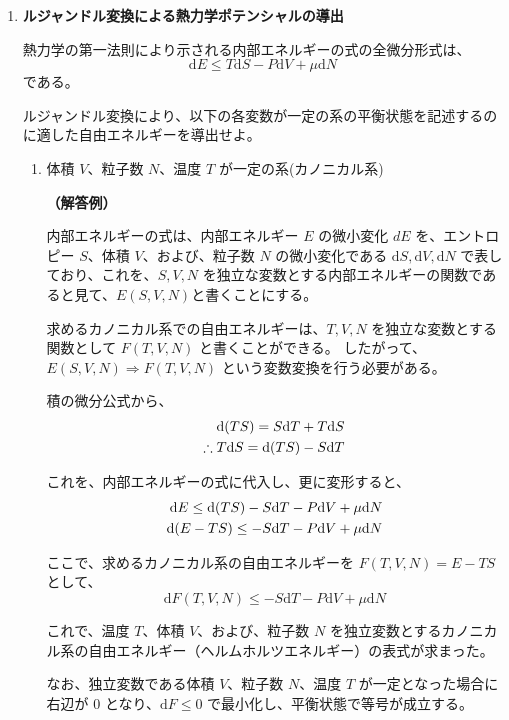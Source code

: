 \documentclass[uplatex,dvipdfmx,a4paper,11pt]{jsarticle}
\newcommand{\diff}{\mathrm d}
\begin{document}
\begin{appendix}
\begin{enumerate}
\begin{enumerate}
\end{enumerate}

\item
{\bf ルジャンドル変換による熱力学ポテンシャルの導出}


熱力学の第一法則により示される内部エネルギーの式の全微分形式は、
\begin{equation*}
\diff E \leq T \diff S - P \diff V + \mu \diff N
\end{equation*}
である。

ルジャンドル変換により、以下の各変数が一定の系の平衡状態を記述するのに適した自由エネルギーを導出せよ。

\begin{enumerate}
\item
体積 $V$、粒子数 $N$、温度 $T$ が一定の系(カノニカル系)

{\bf （解答例）}

内部エネルギーの式は、内部エネルギー $E$ の微小変化 $dE$ を、エントロピー $S$、体積 $V$、および、粒子数 $N$ の微小変化である $\diff S, \diff V, \diff N$ で表しており、これを、$S, V, N$ を独立な変数とする内部エネルギーの関数であると見て、$E(S, V, N)$と書くことにする。

求めるカノニカル系での自由エネルギーは、$T, V, N$ を独立な変数とする関数として $F(T, V, N)$ と書くことができる。
したがって、$E(S, V, N) \Rightarrow F(T, V, N)$ という変数変換を行う必要がある。

積の微分公式から、
\begin{align*}
\diff (TS) = S \diff T + T \diff S \notag \\
\therefore T \diff S = \diff (TS) - S \diff T
\end{align*}
	 	
これを、内部エネルギーの式に代入し、更に変形すると、
\begin{align*}
\diff E \leq \diff (TS) - S \diff T - P \diff V + \mu \diff N \notag \\
\diff (E-TS) \leq -S \diff T - P \diff V + \mu \diff N
\end{align*}

ここで、求めるカノニカル系の自由エネルギーを $F(T,V,N) = E-TS$ として、
\begin{equation*}
\diff F(T,V,N) \leq -S \diff T - P \diff V + \mu \diff N
\end{equation*}
	 	
これで、温度 $T$、体積 $V$、および、粒子数 $N$ を独立変数とするカノニカル系の自由エネルギー（ヘルムホルツエネルギー）の表式が求まった。

なお、独立変数である体積 $V$、粒子数 $N$、温度 $T$ が一定となった場合に右辺が 0 となり、$\diff F \leq 0$ で最小化し、平衡状態で等号が成立する。



\end{enumerate}
\end{enumerate}
\end{appendix}
\end{document}
